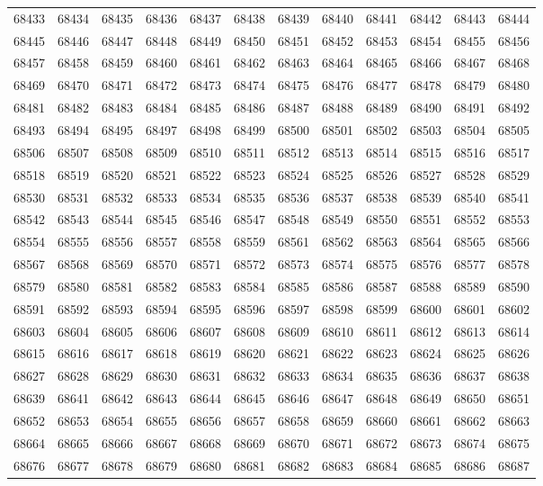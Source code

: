 \begin{center}
\begin{longtable}{llllllllllll}
68433 &68434 &68435 &68436 &68437 &68438 &68439 &68440 &68441 &68442 &68443 &68444 \\
68445 &68446 &68447 &68448 &68449 &68450 &68451 &68452 &68453 &68454 &68455 &68456 \\
68457 &68458 &68459 &68460 &68461 &68462 &68463 &68464 &68465 &68466 &68467 &68468 \\
68469 &68470 &68471 &68472 &68473 &68474 &68475 &68476 &68477 &68478 &68479 &68480 \\
68481 &68482 &68483 &68484 &68485 &68486 &68487 &68488 &68489 &68490 &68491 &68492 \\
68493 &68494 &68495 &68497 &68498 &68499 &68500 &68501 &68502 &68503 &68504 &68505 \\
68506 &68507 &68508 &68509 &68510 &68511 &68512 &68513 &68514 &68515 &68516 &68517 \\
68518 &68519 &68520 &68521 &68522 &68523 &68524 &68525 &68526 &68527 &68528 &68529 \\
68530 &68531 &68532 &68533 &68534 &68535 &68536 &68537 &68538 &68539 &68540 &68541 \\
68542 &68543 &68544 &68545 &68546 &68547 &68548 &68549 &68550 &68551 &68552 &68553 \\
68554 &68555 &68556 &68557 &68558 &68559 &68561 &68562 &68563 &68564 &68565 &68566 \\
68567 &68568 &68569 &68570 &68571 &68572 &68573 &68574 &68575 &68576 &68577 &68578 \\
68579 &68580 &68581 &68582 &68583 &68584 &68585 &68586 &68587 &68588 &68589 &68590 \\
68591 &68592 &68593 &68594 &68595 &68596 &68597 &68598 &68599 &68600 &68601 &68602 \\
68603 &68604 &68605 &68606 &68607 &68608 &68609 &68610 &68611 &68612 &68613 &68614 \\
68615 &68616 &68617 &68618 &68619 &68620 &68621 &68622 &68623 &68624 &68625 &68626 \\
68627 &68628 &68629 &68630 &68631 &68632 &68633 &68634 &68635 &68636 &68637 &68638 \\
68639 &68641 &68642 &68643 &68644 &68645 &68646 &68647 &68648 &68649 &68650 &68651 \\
68652 &68653 &68654 &68655 &68656 &68657 &68658 &68659 &68660 &68661 &68662 &68663 \\
68664 &68665 &68666 &68667 &68668 &68669 &68670 &68671 &68672 &68673 &68674 &68675 \\
68676 &68677 &68678 &68679 &68680 &68681 &68682 &68683 &68684 &68685 &68686 &68687 \\

\end{longtable}
\end{center}
